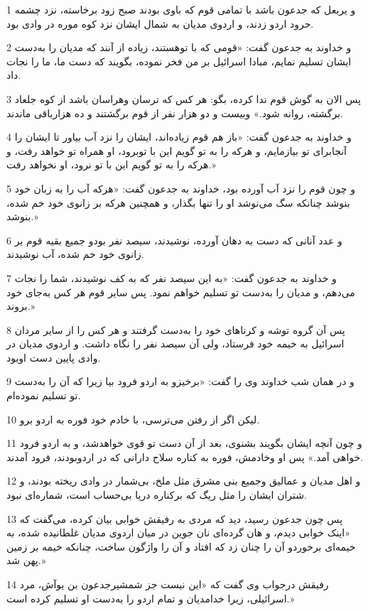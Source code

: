 \par 1 و یربعل که جدعون باشد با تمامی قوم که باوی بودند صبح زود برخاسته، نزد چشمه حرود اردو زدند، و اردوی مدیان به شمال ایشان نزد کوه موره در وادی بود.
\par 2 و خداوند به جدعون گفت: «قومی که با توهستند، زیاده از آنند که مدیان را به‌دست ایشان تسلیم نمایم، مبادا اسرائیل بر من فخر نموده، بگویند که دست ما، ما را نجات داد.
\par 3 پس الان به گوش قوم ندا کرده، بگو: هر کس که ترسان وهراسان باشد از کوه جلعاد برگشته، روانه شود.» وبیست و دو هزار نفر از قوم برگشتند و ده هزارباقی ماندند.
\par 4 و خداوند به جدعون گفت: «باز هم قوم زیاده‌اند، ایشان را نزد آب بیاور تا ایشان را آنجابرای تو بیازمایم، و هر‌که را به تو گویم این با توبرود، او همراه تو خواهد رفت، و هر‌که را به تو گویم این با تو نرود، او نخواهد رفت.»
\par 5 و چون قوم را نزد آب آورده بود، خداوند به جدعون گفت: «هر‌که آب را به زبان خود بنوشد چنانکه سگ می‌نوشد او را تنها بگذار، و همچنین هر‌که بر زانوی خود خم شده، بنوشد.»
\par 6 و عدد آنانی که دست به دهان آورده، نوشیدند، سیصد نفر بودو جمیع بقیه قوم بر زانوی خود خم شده، آب نوشیدند.
\par 7 و خداوند به جدعون گفت: «به این سیصد نفر که به کف نوشیدند، شما را نجات می‌دهم، و مدیان را به‌دست تو تسلیم خواهم نمود. پس سایر قوم هر کس به‌جای خود بروند.»
\par 8 پس آن گروه توشه و کرناهای خود را به‌دست گرفتند و هر کس را از سایر مردان اسرائیل به خیمه خود فرستاد، ولی آن سیصد نفر را نگاه داشت. و اردوی مدیان در وادی پایین دست اوبود.
\par 9 و در همان شب خداوند وی را گفت: «برخیزو به اردو فرود بیا زیرا که آن را به‌دست تو تسلیم نموده‌ام.
\par 10 لیکن اگر از رفتن می‌ترسی، با خادم خود فوره به اردو برو.
\par 11 و چون آنچه ایشان بگویند بشنوی، بعد از آن دست تو قوی خواهدشد، و به اردو فرود خواهی آمد.» پس او وخادمش، فوره به کناره سلاح دارانی که در اردوبودند، فرود آمدند.
\par 12 و اهل مدیان و عمالیق وجمیع بنی مشرق مثل ملخ، بی‌شمار در وادی ریخته بودند، و شتران ایشان را مثل ریگ که برکناره دریا بی‌حساب است، شماره‌ای نبود.
\par 13 پس چون جدعون رسید، دید که مردی به رفیقش خوابی بیان کرده، می‌گفت که «اینک خوابی دیدم، و هان گرده‌ای نان جوین در میان اردوی مدیان غلطانیده شده، به خیمه‌ای برخوردو آن را چنان زد که افتاد و آن را واژگون ساخت، چنانکه خیمه بر زمین پهن شد.»
\par 14 رفیقش درجواب وی گفت که «این نیست جز شمشیرجدعون بن یوآش، مرد اسرائیلی، زیرا خدامدیان و تمام اردو را به‌دست او تسلیم کرده است.»
